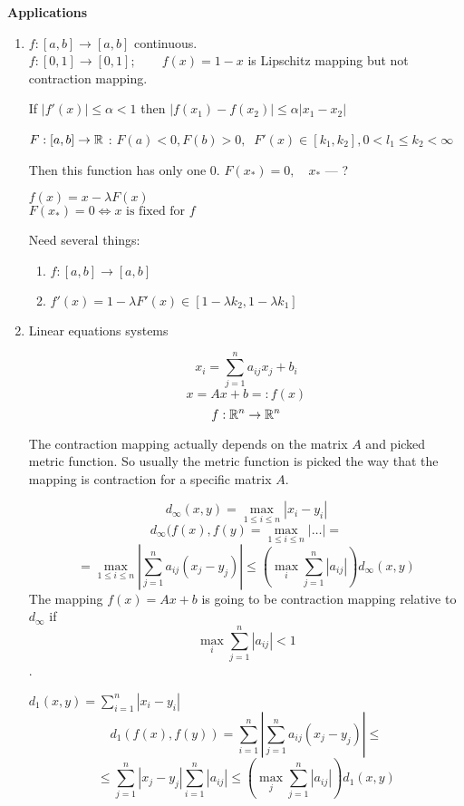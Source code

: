 \textbf{Applications}
\begin{enumerate}
  \item $f: [a,b] \to  [a,b]$ continuous.\\
    $f: [0,1] \to  [0,1]; \qquad f(x) = 1-x$ is Lipschitz mapping but not contraction mapping.

    If $\left| f'(x) \right| \le  \alpha < 1$ then $\left| f(x_1) - f(x_2) \right| \le  \alpha \left| x_1 - x_2 \right| $ 

    $F: [a,b] \to  \mathbb{R}$ : $F(a) < 0, F(b) > 0, \;\; F'(x) \in  [k_1, k_2], 0 < l_1 \le  k_2 < \infty$

    Then this function has only one 0. $F(x_*) = 0, \quad x_*$ --- ?

     $f(x) = x - \lambda F(x)$\\
     $F(x_*) = 0 \iff x \text{ is fixed for } f$

      Need several things:
      \begin{enumerate}
        \item $f: [a,b] \to  [a,b]$
        \item $f'(x) = 1 - \lambda F'(x) \in [1-\lambda k_2, 1-\lambda k_1]$
      \end{enumerate}

    \item Linear equations systems

       \[ x_{i} = \sum_{j=1}^{n} a_{ij} x_j + b_i \] 
       \[ x = Ax + b =: f(x) \] 
       \[ f: \mathbb{R}^{n} \to  \mathbb{R}^{n} \] 

       The contraction mapping actually depends on the matrix $A$ and picked metric function. So usually the metric function is picked the way that the mapping is contraction for a specific matrix  $A$.

        \[ d_{\infty}(x,y) = \max_{1 \le  i \le  n}\left| x_{i} - y_{i} \right|  \] 
        \[ d_{\infty}(f(x), f(y) = \max_{1 \le  i \le  n} \left| \ldots \right| =  \]  
        \[ = \max_{1 \le  i \le n} \left| \sum_{j=1}^{n} a_{ij}(x_{j} - y_{j}) \right| \le \left( \max_{i} \sum_{j=1}^{n} \left| a_{ij} \right|  \right) d_{\infty}(x,y)  \] 
        The mapping $f(x) = Ax + b$ is going to be contraction mapping relative to $d_{\infty}$ if \[ \max_{i} \sum_{j=1}^{n} \left| a_{ij} \right| < 1 \] .

        $d_1(x,y) = \sum_{i=1}^{n} \left| x_{i} - y_{i} \right| $
        \[ d_1(f(x), f(y)) = \sum_{i=1}^{n} \left| \sum_{j=1}^{n} a_{ij}\left( x_j- y_j \right)  \right|  \le  \] 
        \[ \le \sum_{j=1}^{n} \left| x_j - y_j \right| \sum_{i=1}^{n} \left| a_{ij} \right| \le \left( \max_j \sum_{j=1}^{n} \left| a_{ij} \right| \right) d_1(x,y) \] 


\end{enumerate}

